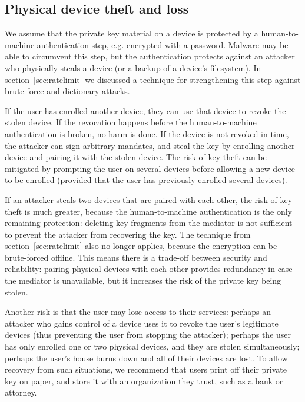 \subsection{Physical device theft and loss}\label{sec:theftloss}

We assume that the private key material on a device is protected by a human-to-machine
authentication step, e.g. encrypted with a password. Malware may be able to circumvent this step,
but the authentication protects against an attacker who physically steals a device (or a backup of a
device's filesystem). In section~\ref{sec:ratelimit} we discussed a technique for strengthening this
step against brute force and dictionary attacks.

If the user has enrolled another device, they can use that device to revoke the stolen device. If
the revocation happens before the human-to-machine authentication is broken, no harm is done. If the
device is not revoked in time, the attacker can sign arbitrary mandates, and steal the key by
enrolling another device and pairing it with the stolen device. The risk of key theft can be
mitigated by prompting the user on several devices before allowing a new device to be enrolled
(provided that the user has previously enrolled several devices).

If an attacker steals two devices that are paired with each other, the risk of key theft is much
greater, because the human-to-machine authentication is the only remaining protection: deleting key
fragments from the mediator is not sufficient to prevent the attacker from recovering the key.  The
technique from section~\ref{sec:ratelimit} also no longer applies, because the encryption can be
brute-forced offline. This means there is a trade-off between security and reliability: pairing
physical devices with each other provides redundancy in case the mediator is unavailable, but it
increases the risk of the private key being stolen.

Another risk is that the user may lose access to their services: perhaps an attacker who gains
control of a device uses it to revoke the user's legitimate devices (thus preventing the user from
stopping the attacker); perhaps the user has only enrolled one or two physical devices, and they are
stolen simultaneously; perhaps the user's house burns down and all of their devices are lost. To
allow recovery from such situations, we recommend that users print off their private key on paper,
and store it with an organization they trust, such as a bank or attorney.

